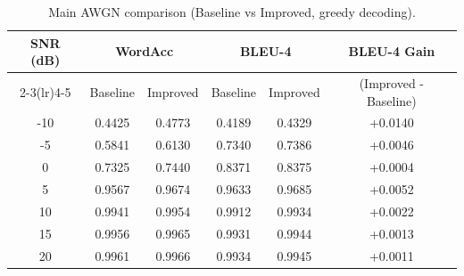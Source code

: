 \begin{table}[htbp]
\centering
\caption{Main AWGN comparison (Baseline vs Improved, greedy decoding).}
\begin{tabular}{cccccc}
\toprule
SNR (dB) & \multicolumn{2}{c}{WordAcc} & \multicolumn{2}{c}{BLEU-4} & BLEU-4 Gain \\
\cmidrule(lr){2-3}\cmidrule(lr){4-5}
& Baseline & Improved & Baseline & Improved & (Improved - Baseline) \\
\midrule
-10 & 0.4425 & 0.4773 & 0.4189 & 0.4329 & +0.0140 \\
-5  & 0.5841 & 0.6130 & 0.7340 & 0.7386 & +0.0046 \\
0   & 0.7325 & 0.7440 & 0.8371 & 0.8375 & +0.0004 \\
5   & 0.9567 & 0.9674 & 0.9633 & 0.9685 & +0.0052 \\
10  & 0.9941 & 0.9954 & 0.9912 & 0.9934 & +0.0022 \\
15  & 0.9956 & 0.9965 & 0.9931 & 0.9944 & +0.0013 \\
20  & 0.9961 & 0.9966 & 0.9934 & 0.9945 & +0.0011 \\
\bottomrule
\end{tabular}
\label{tab:awgn-main}
\end{table}

